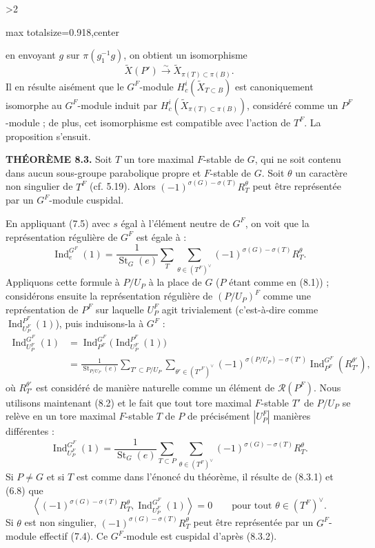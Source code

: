 \documentclass[9pt,twoside]{extarticle}
\newcommand{\EditionPage}[3]{%
  \ifnum#1>2\clearpage\fi
  \pdfbookmark[1]{Printed page #2}{fr-folio-#2}%
  \hypertarget{fr-physical-#1}{}%
  \noindent\begin{adjustbox}{max totalsize={\textwidth}{0.918\textheight},center}
  \begin{minipage}[t]{\textwidth}
  \fontsize{9.4}{11.1}\selectfont\justifying
  #3
  \end{minipage}
  \end{adjustbox}%
}
\begin{document}
\EditionPage{46}{147}{%
en envoyant \(g\) sur \(\pi(g_1^{-1}g)\), on obtient un isomorphisme \[
\widetilde X(P')\xrightarrow{\sim}\widetilde X_{\pi(T)\subset\pi(B)}.
\] Il en résulte aisément que le \(G^F\)-module \(H_c^i(\widetilde X_{T\subset B})\) est canoniquement isomorphe au \(G^F\)-module induit par \(H_c^i(\widetilde X_{\pi(T)\subset\pi(B)})\), considéré comme un \(P^F\)-module ; de plus, cet isomorphisme est compatible avec l'action de \(T^F\). La proposition s'ensuit.\par

\noindent\textbf{THÉORÈME 8.3.} Soit \(T\) un tore maximal \(F\)-stable de \(G\), qui ne soit contenu dans aucun sous-groupe parabolique propre et \(F\)-stable de \(G\). Soit \(\theta\) un caractère non singulier de \(T^F\) (cf. 5.19). Alors \((-1)^{\sigma(G)-\sigma(T)}R_T^\theta\) peut être représentée par un \(G^F\)-module cuspidal.\par

En appliquant (7.5) avec \(s\) égal à l'élément neutre de \(G^F\), on voit que la représentation régulière de \(G^F\) est égale à : \[
\operatorname{Ind}_e^{G^F}(1)
=
\frac1{\operatorname{St}_G(e)}
\sum_T\sum_{\theta\in(T^F)^\vee}
(-1)^{\sigma(G)-\sigma(T)}R_T^\theta.
\] Appliquons cette formule à \(P/U_P\) à la place de \(G\) (\(P\) étant comme en (8.1)) ; considérons ensuite la représentation régulière de \((P/U_P)^F\) comme une représentation de \(P^F\) sur laquelle \(U_P^F\) agit trivialement (c'est-à-dire comme \(\operatorname{Ind}_{U_P^F}^{P^F}(1)\)), puis induisons-la à \(G^F\) : \[
\begin{aligned}
\operatorname{Ind}_{U_P^F}^{G^F}(1)
&=\operatorname{Ind}_{P^F}^{G^F}\bigl(\operatorname{Ind}_{U_P^F}^{P^F}(1)\bigr)\\
&=\frac1{\operatorname{St}_{P/U_P}(e)}
\sum_{T'\subset P/U_P}
\sum_{\theta'\in(T'^F)^\vee}
(-1)^{\sigma(P/U_P)-\sigma(T')}
\operatorname{Ind}_{P^F}^{G^F}(R_{T'}^{\theta'}),
\end{aligned}
\] où \(R_{T'}^{\theta'}\) est considéré de manière naturelle comme un élément de \(\mathcal R(P^F)\). Nous utilisons maintenant (8.2) et le fait que tout tore maximal \(F\)-stable \(T'\) de \(P/U_P\) se relève en un tore maximal \(F\)-stable \(T\) de \(P\) de précisément \(|U_P^F|\) manières différentes : \[
\tag{8.3.1}
\operatorname{Ind}_{U_P^F}^{G^F}(1)
=
\frac1{\operatorname{St}_G(e)}
\sum_{T\subset P}
\sum_{\theta\in(T^F)^\vee}
(-1)^{\sigma(G)-\sigma(T)}R_T^\theta.
\] Si \(P\ne G\) et si \(T\) est comme dans l'énoncé du théorème, il résulte de (8.3.1) et (6.8) que \[
\tag{8.3.2}
\left\langle(-1)^{\sigma(G)-\sigma(T)}R_T^\theta,
\operatorname{Ind}_{U_P^F}^{G^F}(1)\right\rangle=0
\qquad\text{pour tout }\theta\in(T^F)^\vee.
\] Si \(\theta\) est non singulier, \((-1)^{\sigma(G)-\sigma(T)}R_T^\theta\) peut être représentée par un \(G^F\)-module effectif (7.4). Ce \(G^F\)-module est cuspidal d'après (8.3.2).\par

}
\end{document}
